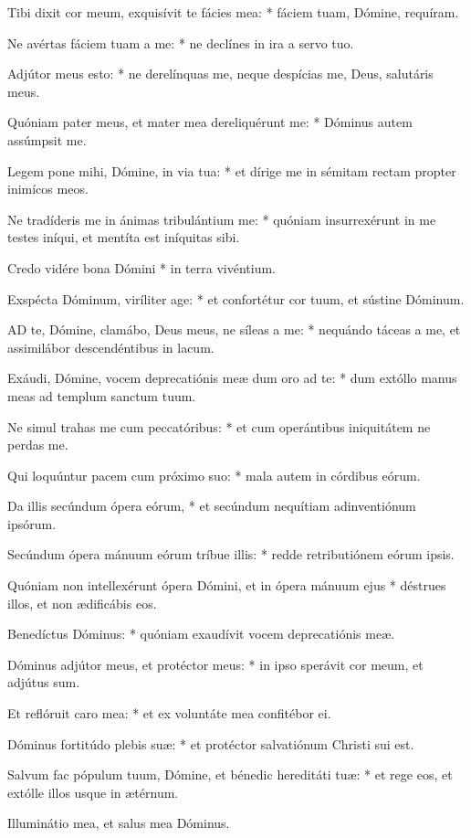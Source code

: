 Tibi dixit cor meum, exquisívit te fácies mea: * fáciem tuam, Dómine, requíram.

Ne avértas fáciem tuam a me: * ne declínes in ira a servo tuo.

Adjútor meus esto: * ne derelínquas me, neque despícias me, Deus, salutáris meus.

Quóniam pater meus, et mater mea dereliquérunt me: * Dóminus autem assúmpsit me.

Legem pone mihi, Dómine, in via tua: * et dírige me in sémitam rectam propter inimícos meos.

Ne tradíderis me in ánimas tribulántium me: * quóniam insurrexérunt in me testes iníqui, et mentíta est iníquitas sibi.

Credo vidére bona Dómini * in terra vivéntium.

Exspécta Dóminum, viríliter age: * et confortétur cor tuum, et sústine Dóminum.


\lettrine[lines=2]{A}{D} te, Dómine, clamábo, Deus meus, ne síleas a me: * nequándo táceas a me, et assimilábor descendéntibus in lacum.

Exáudi, Dómine, vocem deprecatiónis meæ dum oro ad te: * dum extóllo manus meas ad templum sanctum tuum.

Ne simul trahas me cum peccatóribus: * et cum operántibus iniquitátem ne perdas me.

Qui loquúntur pacem cum próximo suo: * mala autem in córdibus eórum.

Da illis secúndum ópera eórum, * et secúndum nequítiam adinventiónum ipsórum.

Secúndum ópera mánuum eórum tríbue illis: * redde retributiónem eórum ipsis.

Quóniam non intellexérunt ópera Dómini, et in ópera mánuum ejus * déstrues illos, et non ædificábis eos.

Benedíctus Dóminus: * quóniam exaudívit vocem deprecatiónis meæ.

Dóminus adjútor meus, et protéctor meus: * in ipso sperávit cor meum, et adjútus sum.

Et reflóruit caro mea: * et ex voluntáte mea confitébor ei.

Dóminus fortitúdo plebis suæ: * et protéctor salvatiónum Christi sui est.

Salvum fac pópulum tuum, Dómine, et bénedic hereditáti tuæ: * et rege eos, et extólle illos usque in ætérnum.

 Illuminátio mea, et salus mea Dóminus.

